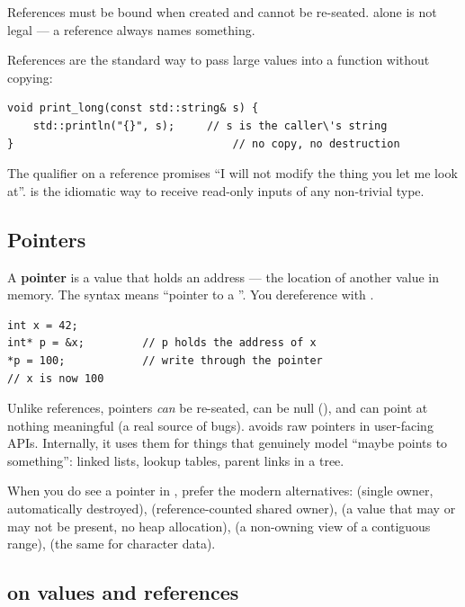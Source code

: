 References must be bound when created and cannot be re-seated.
 alone is not legal --- a reference always names
something.

References are the standard way to pass large values into a function
without copying:

\begin{lstlisting}
void print_long(const std::string& s) {
    std::println("{}", s);     // s is the caller\'s string
}                                  // no copy, no destruction
\end{lstlisting}

The  qualifier on a reference promises ``I will not
modify the thing you let me look at''.  is the
idiomatic way to receive read-only inputs of any non-trivial type.

\subsection{Pointers}

A \textbf{pointer} is a value that holds an address --- the location
of another value in memory. The syntax  means ``pointer to a
''. You dereference with \code{*}.

\begin{lstlisting}
int x = 42;
int* p = &x;         // p holds the address of x
*p = 100;            // write through the pointer
// x is now 100
\end{lstlisting}

Unlike references, pointers \emph{can} be re-seated, can be null
(), and can point at nothing meaningful (a real source
of bugs). \maya{} avoids raw pointers in user-facing APIs.
Internally, it uses them for things that genuinely model ``maybe
points to something'': linked lists, lookup tables, parent links
in a tree.

When you do see a pointer in \maya{}, prefer the modern alternatives:
 (single owner, automatically destroyed),
 (reference-counted shared owner),
 (a value that may or may not be present, no
heap allocation),  (a non-owning view of a
contiguous range),  (the same for character
data).

\subsection{ on values and references}

